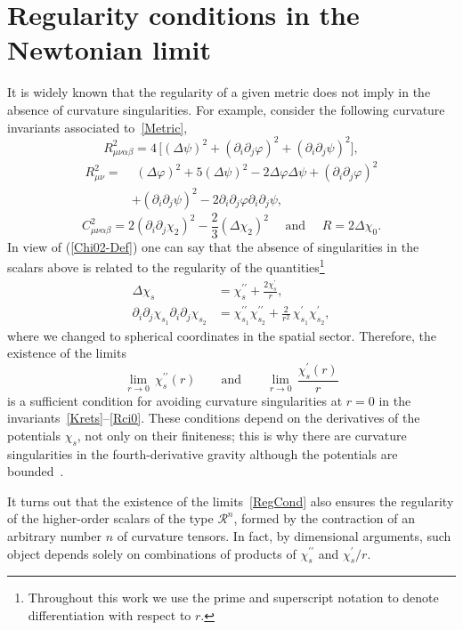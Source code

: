 \documentclass[aps,prd,a4paper,twocolumn,showpacs,showkeys,preprintnumbers,amsmath,amssymb,nofootinbib]{revtex4-2}
\renewcommand{\thesection}{\arabic{section}}
\numberwithin{equation}{section}
\let\oldsection\section%
\renewcommand{\section}{%
  \renewcommand{\theequation}{\thesection.\arabic{equation}}%
  \oldsection}%
\def\beq{\begin{equation}}
\def\eeq{\end{equation}}
\newcommand{\eq}[1]{(\ref{#1})}
\newcommand{\n}[1]{\label{#1}}
\def\al{\alpha}
\def\be{\beta}
\def\De{\Delta}
\def\ph{\varphi}
\def\pa{\partial}
\begin{document}
 
 
\section{Regularity conditions in the Newtonian limit}
\label{Sec3} 

It is widely known that the regularity of a given metric does not imply in the absence of curvature singularities. For example, consider the following curvature invariants associated to~\eqref{Metric},
\beq \label{Krets}
R_{\mu\nu\al\be}^2 = 4 \, \big[  (\De \psi)^2 + (\pa_i \pa_j \ph)^2 +  ( \pa_i \pa_j \psi)^2 \big] 
,
\eeq
\beq
\begin{split}
R_{\mu\nu}^2 =& \,\, (\De \ph)^2 + 5 (\De \psi)^2 - 2 \De \ph \De \psi
+ (\pa_i \pa_j \ph)^2 
\\
&
+ (\pa_i \pa_j \psi)^2  - 2 \pa_i \pa_j \ph \pa_i \pa_j \psi  
,   
\end{split}
\eeq
\beq
\n{Rci0}
C_{\mu\nu\al\be}^2 =  2 ( \pa_i \pa_j \chi_2)^2 - \frac{2}{3} (\De \chi_2)^2
\quad \mbox{ and } \quad
R = 2 \De \chi_0.
\eeq
In view of \eq{Chi02-Def} one can say that the absence of singularities in the scalars above is related to the regularity of the quantities\footnote{Throughout this work we use the prime and superscript notation to denote differentiation with respect to $r$.}
\begin{align}
\n{S1}
\De \chi_s &= \chi_s^{\prime\prime } + \frac{ 2  \chi_s^{\prime}}{r}
,
\\
\n{S2}
\partial_i \partial_j \chi_{s_1} \partial_i \partial_j \chi_{s_2} 
& = \chi_{s_1}^{\prime\prime} \chi_{s_2}^{\prime\prime} + \frac{2}{r^2} \, \chi_{s_1}^{\prime} \chi_{s_2}^{\prime}
,
\end{align}
where we changed to spherical coordinates in the spatial sector.
Therefore, the existence of the limits
\beq \label{RegCond}
\lim_{r \rightarrow 0} \, \chi_s^{\prime\prime}(r) 
\qquad \mbox{and} \qquad
\lim_{r \rightarrow 0} \, \frac{\chi_s^\prime(r)}{r} 
\eeq
is a sufficient condition for avoiding curvature singularities at $r=0$ in the invariants~\eqref{Krets}--\eqref{Rci0}. These conditions depend on the derivatives of the potentials $\chi_s$, not only on their finiteness; this is why there are curvature singularities in the fourth-derivative gravity although the potentials are bounded~\cite{Stelle77,Stelle78}.

It turns out that the existence of the limits~\eqref{RegCond} also ensures the regularity of the higher-order scalars of the type $\mathcal{R}^n$, formed by the contraction of an arbitrary number $n$ of curvature tensors. In fact, by dimensional arguments, such object depends solely on combinations of products of $\chi_s^{\prime\prime}$ and $\chi_s^\prime/ r$. 
\end{document}
